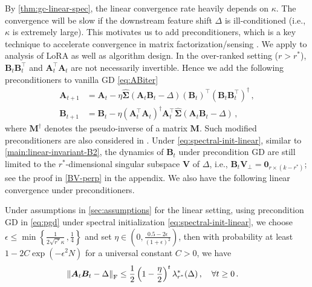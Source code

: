 By \cref{thm:gc-linear-spec}, the linear convergence rate heavily depends on $\kappa$. The convergence will be slow if the downstream feature shift $\Delta$ is ill-conditioned (i.e., $\kappa$ is extremely large). This motivates us to add preconditioners, which is a key technique to accelerate convergence in matrix factorization/sensing \citep{tong2021accelerating,zhang2021preconditioned,zhang2023preconditioned,jia2024preconditioning}. We apply to analysis of LoRA as well as algorithm design. 
In the over-ranked setting ($r>r^*$), $\bm B_t \bm B_t^{\!\top}$ and $\bm A_t^{\!\top} \bm A_t$ are not necessarily invertible. Hence we add the following preconditioners to vanilla GD \eqref{eq:ABiter}
\begin{equation}\label{eq:pgd}
    \begin{split}
\bm A_{t+1} & = \bm A_t - \eta\widehat{\bm \Sigma}\left(\bm A_t \bm B_t-\Delta\right)\left(\bm B_t\right)^{\!\top}\left(\bm B_t \bm B_t^{\!\top}\right)^\dagger\,,\\
    \bm B_{t+1} & = \bm B_t - \eta\left(\bm A_t^{\!\top} \bm A_t\right)^\dagger\bm A_t^{\!\top}\widehat{\bm \Sigma}\left(\bm A_t \bm B_t-\Delta\right)\,,
    \end{split}
\end{equation}
where $\bm M^\dagger$ denotes the pseudo-inverse of a matrix $\bm M$. Such modified preconditioners are also considered in \cite{li2024crucialroleinitializationmatrix}. Under \eqref{eq:spectral-init-linear}, similar to \cref{main:linear-invariant-B2}, the dynamics of $\bm B_t$ under precondition GD are still limited to the $r^*$-dimensional singular subspace $\bm V$ of $\Delta$, i.e., $ \bm B_t \bm V_\perp = \bm 0_{r\times(k-r^*)}$; see the proof in \cref{BV-perp} in the appendix.
We also have the following linear convergence under preconditioners.
\begin{theorem}
    \label{main:prec-gd-linear-conv}
    Under assumptions in \cref{sec:assumptions} for the linear setting, using precondition GD in \cref{eq:pgd} under spectral initialization \eqref{eq:spectral-init-linear}, we choose $\epsilon\leq\min\left\{\frac{1}{2\sqrt{r^*}\kappa}\,,\frac{1}{4}\right\}$ and set $ \eta \in \left(0, \frac{0.5-2\epsilon}{(1+\epsilon)^2}\right) $, then with probability at least $1- 2C\exp(-\epsilon^2 N)$ for a universal constant $C>0$, we have
    \begin{align*}
        \left\|\bm A_t \bm B_t - \Delta \right\|_{\rm F} & \leq \frac{1}{2}\left(1-\frac{\eta}{2}\right)^t\lambda_{r^*}^*(\Delta)\,, \quad \forall t \geq 0\,.
    \end{align*}
\end{theorem}
